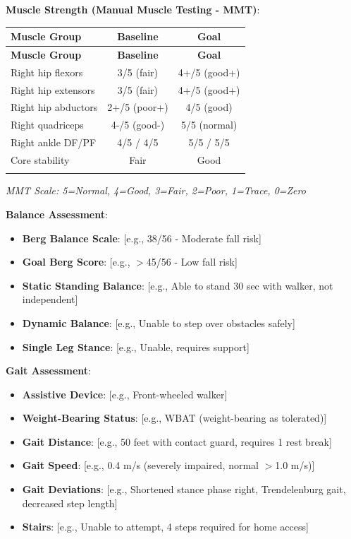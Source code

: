 \documentclass[11pt,letterpaper]{article}
\begin{document}
\textbf{Muscle Strength (Manual Muscle Testing - MMT)}:
\begin{longtable}{|l|c|c|}
\hline
\textbf{Muscle Group} & \textbf{Baseline} & \textbf{Goal} \\ \hline
\endfirsthead
\hline
\textbf{Muscle Group} & \textbf{Baseline} & \textbf{Goal} \\ \hline
\endhead
Right hip flexors & 3/5 (fair) & 4+/5 (good+) \\ \hline
Right hip extensors & 3/5 (fair) & 4+/5 (good+) \\ \hline
Right hip abductors & 2+/5 (poor+) & 4/5 (good) \\ \hline
Right quadriceps & 4-/5 (good-) & 5/5 (normal) \\ \hline
Right ankle DF/PF & 4/5 / 4/5 & 5/5 / 5/5 \\ \hline
Core stability & Fair & Good \\ \hline
[Additional muscles] & & \\ \hline
\end{longtable}

\textit{MMT Scale: 5=Normal, 4=Good, 3=Fair, 2=Poor, 1=Trace, 0=Zero}

\textbf{Balance Assessment}:
\begin{itemize}[leftmargin=*]
    \item \textbf{Berg Balance Scale}: [e.g., 38/56 - Moderate fall risk]
    \item \textbf{Goal Berg Score}: [e.g., $>$45/56 - Low fall risk]
    \item \textbf{Static Standing Balance}: [e.g., Able to stand 30 sec with walker, not independent]
    \item \textbf{Dynamic Balance}: [e.g., Unable to step over obstacles safely]
    \item \textbf{Single Leg Stance}: [e.g., Unable, requires support]
\end{itemize}

\textbf{Gait Assessment}:
\begin{itemize}[leftmargin=*]
    \item \textbf{Assistive Device}: [e.g., Front-wheeled walker]
    \item \textbf{Weight-Bearing Status}: [e.g., WBAT (weight-bearing as tolerated)]
    \item \textbf{Gait Distance}: [e.g., 50 feet with contact guard, requires 1 rest break]
    \item \textbf{Gait Speed}: [e.g., 0.4 m/s (severely impaired, normal $>$1.0 m/s)]
    \item \textbf{Gait Deviations}: [e.g., Shortened stance phase right, Trendelenburg gait, decreased step length]
    \item \textbf{Stairs}: [e.g., Unable to attempt, 4 steps required for home access]
\end{itemize}
\end{document}
